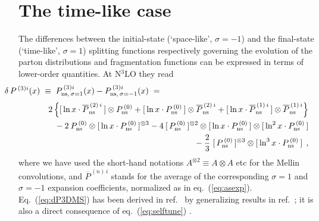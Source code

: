 \documentclass[12pt]{article}
\newcommand{\bea}{\begin{eqnarray}}
\newcommand{\eea}{\end{eqnarray}}
\newcommand{\nn}{\nonumber}
\newcommand{\hspn}{{\hspace{-5mm}}}
\newcommand{\hspp}{{\hspace{5mm}}}
\begin{document}
\setcounter{equation}{0}
\section{The time-like case}
\label{sec:timelike}

The differences between the initial-state (`space-like', $\sigma = -1$) and
the final-state (`time-like', $\sigma = 1$) splitting functions respectively
governing the evolution of the parton distributions and fragmentation functions
can be expressed in terms of lower-order quantities. At N$^3$LO they read
%
\bea
{\lefteqn{ \hspn\hspn
 \delta\, P^{\,(3)i}(x) \;\equiv\; P^{\,(3)i}_{{\rm ns},\,\sigma=1}(x)
 - P^{\,(3)i}_{{\rm ns},\,\sigma=-1}(x) \;=\;
}}
\nn \\[1mm] && \hspp
%
  2 \left\{ [\, \ln x \cdot \overline{P}_{\rm ns}^{\,(2)\,i} \,] 
  \otimes P_{\rm ns}^{\,(0)}  
    + [\, \ln x \cdot P_{\rm ns}^{\,(0)} \,]
      \otimes \overline{P}_{\rm ns}^{\,(2)\,i} 
    + [\, \ln x \cdot \overline{P}_{\rm ns}^{\,(1)\,i} \,]
      \otimes \overline{P}_{\rm ns}^{\,(1)\,i} 
\right\}
\nn\\ & & \mbox{}
  - 2\: P_{\rm ns}^{\,(0)} \otimes [\, \ln x \cdot P_{\rm ns}^{\,(0)} \,]^{\otimes 3} - 4\: [\, P_{\rm ns}^{\,(0)} \,]^{\otimes 2} \otimes [\, \ln x \cdot P_{\rm ns}^{\,(0)} \,] \otimes [\, \ln^2 x \cdot P_{\rm ns}^{\,(0)} \,]
\nn\\ & & \mbox{}
  - \frac{2}{3}\; [\, P_{\rm ns}^{\,(0)} \,]^{\otimes 3} \otimes [\, \ln^3 x \cdot P_{\rm ns}^{\,(0)} \,]
\:\: ,
\label{eq:dP3DMS}
\eea
%
where we have used the short-hand notations $A^{\otimes 2} \equiv A \otimes A$
etc for the Mellin convolutions, and $\overline{P}^{\,(n)\,i}$ stands for the 
average of the corresponding $\sigma=1$ and $\sigma=-1$ expansion coefficients,
normalized as in eq.~(\ref{eq:asexp}).
Eq.~(\ref{eq:dP3DMS}) has been derived in ref.~\cite{Mitov:2006ic} by
generalizing results in ref.~\cite{Dokshitzer:2005bf}; it is also a direct
consequence of eq.~(\ref{eq:selftune}) \cite{Basso:2006nk}.
\end{document}
